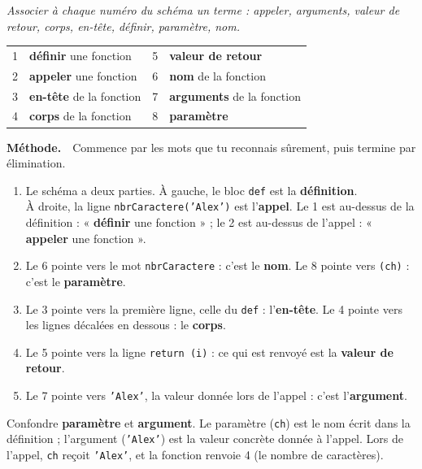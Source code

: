 \documentclass[addpoints, 11pt]{exam}
\newcommand{\enonce}[1]{\textit{#1}\par\smallskip}
\newcommand{\methode}{\par\smallskip\noindent\textbf{Méthode.}\ }
\newcommand{\code}[1]{\texttt{#1}}
\DeclareRobustCommand{\_}{\textunderscore\allowbreak}
\begin{document}
\begin{questions}
\question[4] \enonce{Associer à chaque numéro du schéma un terme : appeler, arguments, valeur de retour, corps, en-tête, définir, paramètre, nom.}
\begingroup
{}

\endgroup
\begin{reponse}
\begin{tabular}{cl@{\qquad}cl}
1 & \textbf{définir} une fonction & 5 & \textbf{valeur de retour} \\
2 & \textbf{appeler} une fonction & 6 & \textbf{nom} de la fonction \\
3 & \textbf{en-tête} de la fonction & 7 & \textbf{arguments} de la fonction \\
4 & \textbf{corps} de la fonction & 8 & \textbf{paramètre} \\
\end{tabular}
\end{reponse}
\methode\ Commence par les mots que tu reconnais sûrement, puis termine par élimination.
\begin{enumerate}
  \item Le schéma a deux parties. À gauche, le bloc \code{def} est la \textbf{définition}.\\ À droite, la ligne \code{nbrCaractere('Alex')} est l'\textbf{appel}. Le 1 est au-dessus de la définition : « \textbf{définir} une fonction » ; le 2 est au-dessus de l'appel : « \textbf{appeler} une fonction ».
  \item Le 6 pointe vers le mot \code{nbrCaractere} : c'est le \textbf{nom}. Le 8 pointe vers \code{(ch)} : c'est le \textbf{paramètre}.
  \item Le 3 pointe vers la première ligne, celle du \code{def} : l'\textbf{en-tête}. Le 4 pointe vers les lignes décalées en dessous : le \textbf{corps}.
  \item Le 5 pointe vers la ligne \code{return (i)} : ce qui est renvoyé est la \textbf{valeur de retour}.
  \item Le 7 pointe vers \code{'Alex'}, la valeur donnée lors de l'appel : c'est l'\textbf{argument}.
\end{enumerate}
\begin{erreur}
Confondre \textbf{paramètre} et \textbf{argument}. Le paramètre (\code{ch}) est le nom écrit dans la définition ; l'argument (\code{'Alex'}) est la valeur concrète donnée à l'appel. Lors de l'appel, \code{ch} reçoit \code{'Alex'}, et la fonction renvoie 4 (le nombre de caractères).
\end{erreur}



\end{questions}
\end{document}
